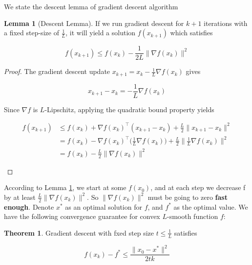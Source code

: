 \documentclass[12pt]{article} %
\theoremstyle{definition}
\newtheorem{lemma}{Lemma}
\newtheorem{theorem}{Theorem}
\begin{document}
We state the descent lemma of gradient descent algorithm

\begin{lemma}[Descent Lemma]
	\label{lemma:descent lemma}
	If we run gradient descent for $k + 1$ iterations with a fixed step-size of $\frac{1}{L}$,  it will yield a solution $f(x_{k + 1})$ which satisfies

	$$
		f(x_{k + 1}) \le f(x_k) - \frac{1}{2L} \| \nabla f(x_k) \|^2
	$$
\end{lemma}

\begin{proof}
	The gradient descent update $x_{k + 1} = x_k - \frac{1}{L} \nabla f(x_k)$ gives

	$$
		x_{k + 1} - x_k = - \frac{1}{L} \nabla f(x_k)
	$$

	Since $\nabla f$ is $L$-Lipschitz, applying the quadratic bound property yields
	\begin{ceqn}
		\begin{align*}
			f(x_{k + 1})
			&\le f(x_k) + \nabla f(x_k)^\intercal (x_{k + 1} - x_k) + \frac{L}{2} \| x_{k + 1} - x_k \|^2 \\
			&=   f(x_k) - \nabla f(x_k)^\intercal \bigg( \frac{1}{L} \nabla f(x_k) \bigg) + \frac{L}{2} \Big\| \frac{1}{L} \nabla f(x_k) \Big\|^2 \\
			&=  f(x_k) - \frac{L}{2} \| \nabla f(x_k) \|^2
		\end{align*}
	\end{ceqn}
\end{proof}

According to Lemma \ref{lemma:descent lemma},   we start at some $f(x_0)$, and at each step we decrease f by at least $\frac{L}{2} \| \nabla f(x_k) \|^2$. So $\| \nabla f(x_k) \|^2$ must be going to zero \textbf{fast enough}.  Denote $x^*$ as an optimal solution for $f$, and $f^*$ as the optimal value. We have the following convergence guarantee for convex $L$-smooth function $f$:

\begin{theorem}
	\label{thm:convergence analysis fixed step}
	 Gradient descent with fxed step size $t \le \frac{1}{L}$ satisfies

	$$
		f(x_k) - f^* \le \frac{\|x_0 - x^*\|^2}{2tk}
	$$
\end{theorem}
\end{document}
